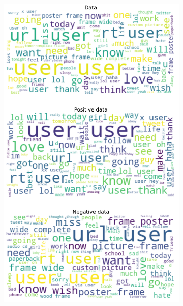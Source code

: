 \documentclass{article}
\begin{document}
\begin{itemize}
  \begin{figure}[H]
    \centering
    \captionsetup{justification=centering}
    \begin{subfigure}[b]{0.24\textwidth}
      \centering
      \includegraphics[width=\textwidth]{chapter-06/section-01-01/10/visualization/1/wordcloud.png}
    \end{subfigure}
    \begin{subfigure}[b]{0.24\textwidth}
      \centering

\end{subfigure}
\end{figure}
\end{itemize}
\end{document}
